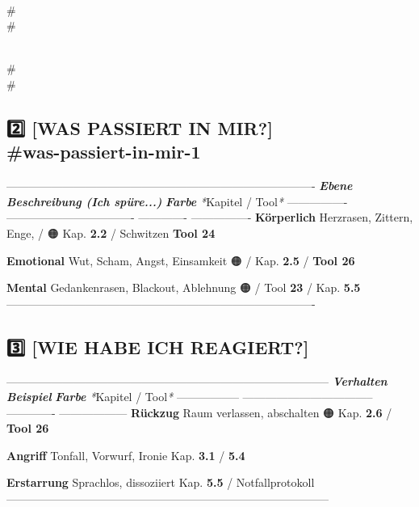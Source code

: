 {\\#\\#

\\#\\#

\subsection{2️⃣ \textbf{[WAS PASSIERT IN MIR?]} {\\#was-passiert-in-mir-1}}

----------------------------------------------------------------------------------
\textbf{\textit{Ebene}}      \textbf{\textit{Beschreibung (Ich spüre...)}}  \textbf{\textit{Farbe}}   \textit{*}Kapitel /
Tool\textit{*}
---------------- ---------------------------------- ------------- ----------------
\textbf{Körperlich}   Herzrasen, Zittern, Enge,          \textcolor{ctmmGreen}{\faCircle} / 🟠       Kap. \textbf{2.2} /
Schwitzen                                        \textbf{Tool 24}

\textbf{Emotional}    Wut, Scham, Angst, Einsamkeit      🟠 / \textcolor{ctmmRed}{\faCircle}       Kap. \textbf{2.5} /
\textbf{Tool 26}

\textbf{Mental}       Gedankenrasen, Blackout, Ablehnung 🟠 / \textcolor{ctmmRed}{\faCircle}       Tool \textbf{23} /
Kap. \textbf{5.5}
----------------------------------------------------------------------------------

\subsection{3️⃣ \textbf{[WIE HABE ICH REAGIERT?]}}

--------------------------------------------------------------------------------------
\textbf{\textit{Verhalten}}   \textbf{\textit{Beispiel}}                      \textbf{\textit{Farbe}}   \textit{*}Kapitel /
Tool\textit{*}
----------------- ----------------------------------- ------------- ------------------
\textbf{Rückzug}       Raum verlassen, abschalten          🟠            Kap. \textbf{2.6} /
\textbf{Tool 26}

\textbf{Angriff}       Tonfall, Vorwurf, Ironie            \textcolor{ctmmRed}{\faCircle}            Kap. \textbf{3.1} /
\textbf{5.4}

\textbf{Erstarrung}    Sprachlos, dissoziiert              \textcolor{ctmmRed}{\faCircle}            Kap. \textbf{5.5} /
Notfallprotokoll
--------------------------------------------------------------------------------------

}
